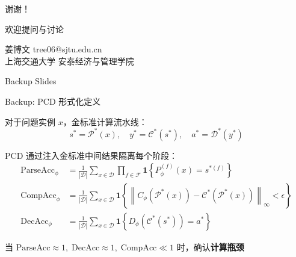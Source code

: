 \documentclass[aspectratio=169,10pt]{beamer}
\begin{document}
\begin{frame}[plain]
\vfill
\begin{center}
{\Huge 谢谢！}

\vspace{12pt}
{\large 欢迎提问与讨论}

\vspace{20pt}
{\small 姜博文 \quad tree06@sjtu.edu.cn\\[4pt]
上海交通大学 安泰经济与管理学院}
\end{center}
\vfill
\end{frame}

\appendix

\begin{frame}{Backup Slides}
\end{frame}

\begin{frame}{Backup: PCD 形式化定义}
\vspace{2pt}

对于问题实例 $x$，金标准计算流水线：
\[
s^* = \mathcal{P}^*(x), \quad y^* = \mathcal{C}^*(s^*), \quad a^* = \mathcal{D}^*(y^*)
\]

PCD 通过注入金标准中间结果隔离每个阶段：
\begin{align}
\text{ParseAcc}_\phi &= \frac{1}{|\mathcal{D}|}\sum_{x \in \mathcal{D}} \prod_{f \in \mathcal{F}} \mathbf{1}\!\left\{P_\phi^{(f)}(x) = s^{*(f)}\right\} \\[4pt]
\text{CompAcc}_\phi &= \frac{1}{|\mathcal{D}|}\sum_{x \in \mathcal{D}} \mathbf{1}\!\left\{\left\|C_\phi\!\left(\mathcal{P}^*(x)\right) - \mathcal{C}^*\!\left(\mathcal{P}^*(x)\right)\right\|_\infty < \epsilon\right\} \\[4pt]
\text{DecAcc}_\phi &= \frac{1}{|\mathcal{D}|}\sum_{x \in \mathcal{D}} \mathbf{1}\!\left\{D_\phi\!\left(\mathcal{C}^*(s^*)\right) = a^*\right\}
\end{align}

当 $\text{ParseAcc} \approx 1,\; \text{DecAcc} \approx 1,\; \text{CompAcc} \ll 1$ 时，确认\textbf{计算瓶颈}
\end{frame}
\end{document}

